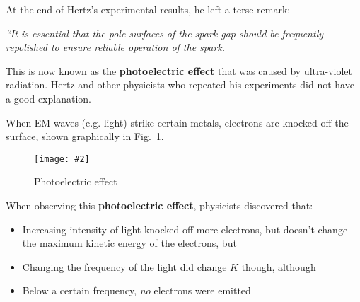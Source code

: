 \documentclass[11pt]{article}
\newcommand{\pic}[2]{\texttt{[image: \#2]}}
\begin{document}
At the end of Hertz's experimental results, he left a terse remark:
\begin{center}
  \begin{minipage}{.8\textwidth}
    \emph{``It is essential that the pole surfaces of the spark gap should be
      frequently repolished to ensure reliable operation of the spark.}
  \end{minipage}
\end{center}
This is now known as the \textbf{photoelectric effect} that was caused by
ultra-violet radiation. Hertz and other physicists who repeated his experiments
did not have a good explanation.

When EM waves (e.g. light) strike certain metals, electrons are knocked off the
surface, shown graphically in Fig.~\ref{fig:photo1}.
\begin{figure}[ht]
  \centering
  \pic{.9}{../73bacc9f2bf571752483a89ef6c61a94f07470f7.png}
  \caption{Photoelectric effect}
  \label{fig:photo1}
\end{figure}
When observing this \textbf{photoelectric effect}, physicists discovered that:
\begin{itemize}[noitemsep,topsep=0pt]
\item Increasing intensity of light knocked off more electrons, but doesn't
  change the maximum kinetic energy of the electrons, but
\item Changing the frequency of the light did change $K$ though, although
\item Below a certain frequency, \emph{no} electrons were emitted
\end{itemize}
\end{document}
